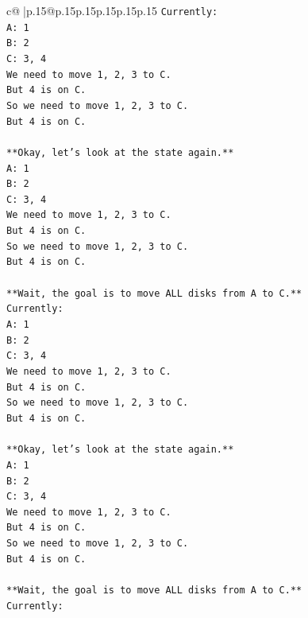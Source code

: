\documentclass{article}
\begin{document}
{\begin{supertabular}{c@{$\;$}|p{.15\linewidth}@{}p{.15\linewidth}p{.15\linewidth}p{.15\linewidth}p{.15\linewidth}p{.15\linewidth}}
{{{\texttt{Currently:} \\
\texttt{A: 1} \\
\texttt{B: 2} \\
\texttt{C: 3, 4} \\
\texttt{We need to move 1, 2, 3 to C.} \\
\texttt{But 4 is on C.} \\
\texttt{So we need to move 1, 2, 3 to C.} \\
\texttt{But 4 is on C.} \\
\\ 
\texttt{**Okay, let's look at the state again.**} \\
\texttt{A: 1} \\
\texttt{B: 2} \\
\texttt{C: 3, 4} \\
\texttt{We need to move 1, 2, 3 to C.} \\
\texttt{But 4 is on C.} \\
\texttt{So we need to move 1, 2, 3 to C.} \\
\texttt{But 4 is on C.} \\
\\ 
\texttt{**Wait, the goal is to move ALL disks from A to C.**} \\
\texttt{Currently:} \\
\texttt{A: 1} \\
\texttt{B: 2} \\
\texttt{C: 3, 4} \\
\texttt{We need to move 1, 2, 3 to C.} \\
\texttt{But 4 is on C.} \\
\texttt{So we need to move 1, 2, 3 to C.} \\
\texttt{But 4 is on C.} \\
\\ 
\texttt{**Okay, let's look at the state again.**} \\
\texttt{A: 1} \\
\texttt{B: 2} \\
\texttt{C: 3, 4} \\
\texttt{We need to move 1, 2, 3 to C.} \\
\texttt{But 4 is on C.} \\
\texttt{So we need to move 1, 2, 3 to C.} \\
\texttt{But 4 is on C.} \\
\\ 
\texttt{**Wait, the goal is to move ALL disks from A to C.**} \\
\texttt{Currently:} \\
}}}
\end{supertabular}}
\end{document}
